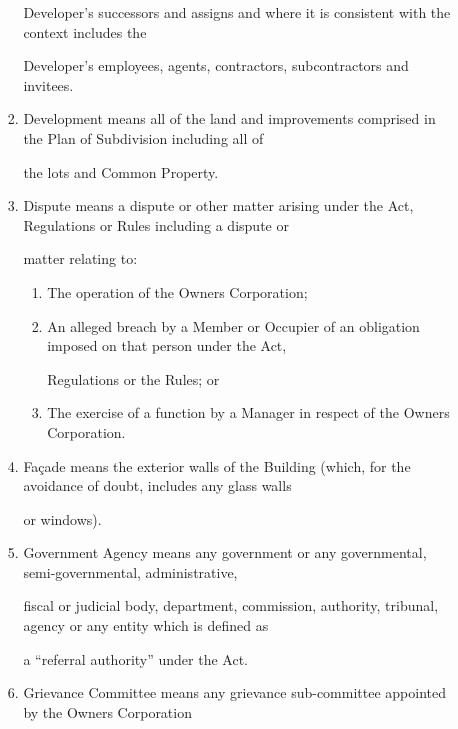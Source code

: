 \documentclass{article}
\begin{document}
\begin{enumerate}[label=\arabic*.]
\begin{enumerate}[label=\arabic{enumi}.\arabic*.]
\begin{enumerate}[label=(\arabic*)]
{\fontsize{10.02}{1}Developer’s successors and assigns and where it is consistent with the context includes the }

{\fontsize{10.02}{1}Developer’s employees, agents, contractors, subcontractors and invitees. }

\item {\fontsize{9.962}{1} Development means all of the land and improvements comprised in the Plan of Subdivision including all of }

{\fontsize{10.02}{1}the lots and Common Property. }

\item {\fontsize{9.962}{1} Dispute means a dispute or other matter arising under the Act, Regulations or Rules including a dispute or }

{\fontsize{10.02}{1}matter relating to: }

\begin{enumerate}[label=(\alph*)]
\item {\fontsize{9.962}{1} The operation of the Owners Corporation; }

\item {\fontsize{9.962}{1} An alleged breach by a Member or Occupier of an obligation imposed on that person under the Act, }

{\fontsize{10.02}{1}Regulations or the Rules; or }

\item {\fontsize{9.962}{1} The exercise of a function by a Manager in respect of the Owners Corporation. }

\end{enumerate}
\item {\fontsize{9.962}{1} Façade means the exterior walls of the Building (which, for the avoidance of doubt, includes any glass walls }

{\fontsize{10.02}{1}or windows). }

\item {\fontsize{9.962}{1} Government Agency means any government or any governmental, semi-governmental, administrative, }

{\fontsize{10.02}{1}fiscal or judicial body, department, commission, authority, tribunal, agency or any entity which is defined as }

{\fontsize{10.02}{1}a “referral authority” under the Act. }

\item {\fontsize{9.962}{1} Grievance Committee means any grievance sub-committee appointed by the Owners Corporation }


\end{enumerate}
\end{enumerate}
\end{enumerate}
\end{document}
